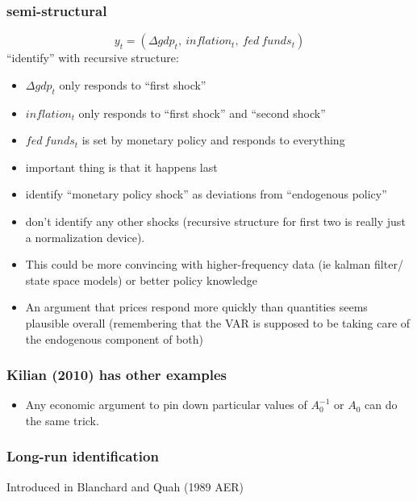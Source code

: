\subsubsection{semi-structural}
\[y_t = (\Delta  gdp_t,\ inflation_t,\ fed\ funds_t)\]
``identify'' with recursive structure:
\begin{itemize}
\item $\Delta  gdp_t$ only responds to
``first shock''
\item $inflation_t$ only responds to ``first shock'' and
``second shock''
\item $fed\ funds_t$ is set by monetary policy and responds
to everything
\item important thing is that it happens last
\item identify ``monetary policy shock'' as deviations from
  ``endogenous policy''
\item don't identify any other shocks (recursive structure for first
  two is really just a normalization device).
\end{itemize}

\begin{itemize}
\item This could be more convincing with higher-frequency data (ie
  kalman filter/ state space models) or better policy knowledge
\item An argument that prices respond more quickly than quantities
  seems plausible overall (remembering that the VAR is supposed to be
  taking care of the endogenous component of both)
\end{itemize}

\subsubsection{Kilian (2010) has other examples}

\begin{itemize}
\item Any economic argument to pin down particular values of
  $A_0^{-1}$ or $A_0$ can do the same trick.
\end{itemize}

\subsubsection{Long-run identification}

Introduced in Blanchard and Quah (1989 AER)

